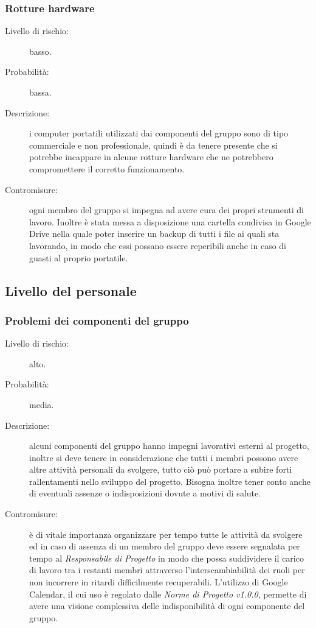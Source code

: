 \subsubsection{Rotture hardware}
\begin{description}
	\item[Livello di rischio:] basso.
	\item[Probabilità:] bassa.
	\item[Descrizione:] i computer portatili utilizzati dai componenti del gruppo sono di tipo commerciale e non professionale, quindi è da tenere presente che si potrebbe incappare in alcune rotture hardware che ne potrebbero compromettere il corretto funzionamento.
	\item[Contromisure:] ogni membro del gruppo si impegna ad avere cura dei propri strumenti di lavoro. Inoltre è stata messa a disposizione una cartella condivisa in \gls{Google Drive} nella quale poter inserire un backup di tutti i file ai quali sta lavorando, in modo che essi possano essere reperibili anche in caso di guasti al proprio portatile.
\end{description}

\subsection{Livello del personale}
\subsubsection{Problemi dei componenti del gruppo}
\begin{description}
	\item[Livello di rischio:] alto.
	\item[Probabilità:] media.
	\item[Descrizione:] alcuni componenti del gruppo hanno impegni lavorativi esterni al progetto, inoltre si deve tenere in considerazione che tutti i membri possono avere altre attività personali da svolgere, tutto ciò può portare a subire forti rallentamenti nello sviluppo del progetto. Bisogna inoltre tener conto anche di eventuali assenze o indisposizioni dovute a motivi di salute.
	\item[Contromisure:] è di vitale importanza organizzare per tempo tutte le attività da svolgere ed in caso di assenza di un membro del gruppo deve essere segnalata per tempo al \textit{Responsabile di Progetto} in modo che possa suddividere il carico di lavoro tra i restanti membri attraverso l'interscambiabilità dei ruoli per non incorrere in ritardi difficilmente recuperabili. L'utilizzo di \gls{Google Calendar}, il cui uso è regolato dalle \textit{Norme di Progetto v1.0.0}, permette di avere una visione complessiva delle indisponibilità di ogni componente del gruppo. 
\end{description}
